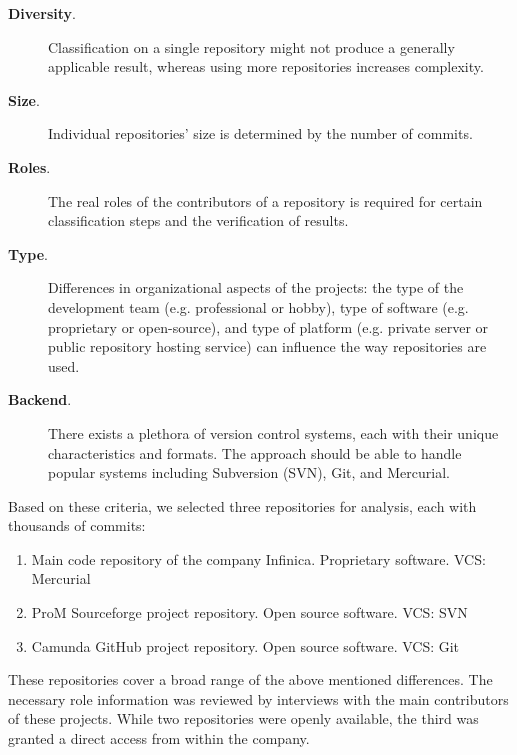 \begin{description}

\item[\textbf{Diversity}.] Classification on a single repository might not produce a generally applicable result, whereas using more repositories increases complexity.

\item[\textbf{Size}.] Individual repositories' size is determined by the number of commits.

\item[\textbf{Roles}.] The real roles of the contributors of a repository is required for certain classification steps and the verification of results.

\item[\textbf{Type}.] Differences in organizational aspects of the projects: the type of the development team (e.g. professional or hobby), type of software (e.g. proprietary or open-source), and type of platform (e.g. private server or public repository hosting service) can influence the way repositories are used.

\item[\textbf{Backend}.] There exists a plethora of version control systems, each with their unique characteristics and formats. The approach should be able to handle popular systems including Subversion (SVN), Git, and Mercurial.

\end{description}

Based on these criteria, we selected three repositories for analysis, each with thousands of commits:

\begin{enumerate}

\item Main code repository of the company Infinica. Proprietary software. VCS: Mercurial

\item ProM Sourceforge project repository. Open source software. VCS: SVN

\item Camunda GitHub project repository. Open source software. VCS: Git

\end{enumerate}


These repositories cover a broad range of the above mentioned differences. The necessary role information was reviewed by interviews with the main contributors of these projects. While two repositories were openly available, the third was granted a direct access from within the company.

